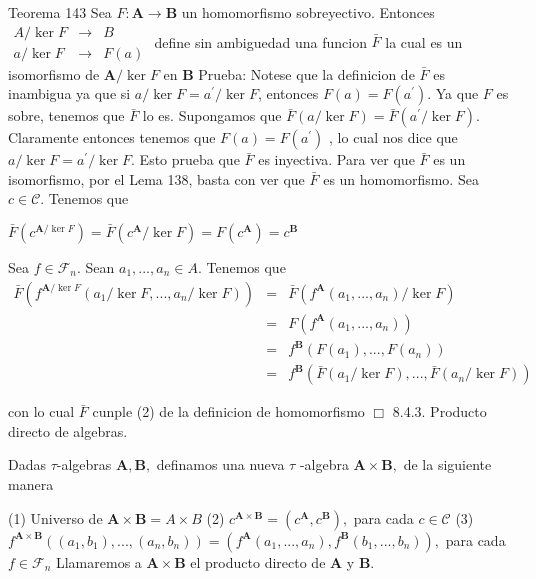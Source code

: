 Teorema 143 Sea \(F:\mathbf{A}\rightarrow \mathbf{B}\) un homomorfismo sobreyectivo. Entonces
\(\displaystyle \begin{array}{lll} A/\ker F & \rightarrow & B \\ a/\ker F & \rightarrow & F(a) \end{array} \)
define sin ambiguedad una funcion \(\bar{F}\) la cual es un isomorfismo de \( \mathbf{A}/\ker F\) en \(\mathbf{B}\)
Prueba: Notese que la definicion de \(\bar{F}\) es inambigua ya que si \(a/\ker F=a^{\prime }/\ker F\), entonces \(F(a)=F(a^{\prime }).\) Ya que \(F\) es sobre, tenemos que \(\bar{F}\) lo es. Supongamos que \(\bar{F}(a/\ker F)=\bar{F} (a^{\prime }/\ker F).\) Claramente entonces tenemos que \(F(a)=F(a^{\prime })\) , lo cual nos dice que \(a/\ker F=a^{\prime }/\ker F\). Esto prueba que \(\bar{F }\) es inyectiva. Para ver que \(\bar{F}\) es un isomorfismo, por el Lema 138, basta con ver que \(\bar{F}\) es un homomorfismo. Sea \(c\in \mathcal{C}\). Tenemos que

\(\displaystyle \bar{F}(c^{\mathbf{A}/\ker F})=\bar{F}(c^{\mathbf{A}}/\ker F)=F(c^{\mathbf{A} })=c^{\mathbf{B}} \)

Sea \(f\in \mathcal{F}_{n}\). Sean \(a_{1},...,a_{n}\in A\). Tenemos que
\(\displaystyle \begin{array}{ccl} \bar{F}(f^{\mathbf{A}/\ker F}(a_{1}/\ker F,...,a_{n}/\ker F)) & = & \bar{F} (f^{\mathbf{A}}(a_{1},...,a_{n})/\ker F) \\ & = & F(f^{\mathbf{A}}(a_{1},...,a_{n})) \\ & = & f^{\mathbf{B}}(F(a_{1}),...,F(a_{n})) \\ & = & f^{\mathbf{B}}(\bar{F}(a_{1}/\ker F),...,\bar{F}(a_{n}/\ker F)) \end{array} \)

con lo cual \(\bar{F}\) cunple (2) de la definicion de homomorfismo \(\Box\)
8.4.3. Producto directo de algebras.

Dadas \(\tau \)-algebras \(\mathbf{A},\mathbf{B},\) definamos una nueva \(\tau \) -algebra \(\mathbf{A}\times \mathbf{B},\) de la siguiente manera

(1) Universo de \(\mathbf{A}\times \mathbf{B}=A\times B\)
(2) \(c^{\mathbf{A}\times \mathbf{B}}=(c^{\mathbf{A}},c^{\mathbf{B}}),\) para cada \(c\in \mathcal{C}\)
(3) \(f^{\mathbf{A}\times \mathbf{B} }((a_{1},b_{1}),...,(a_{n},b_{n}))=(f^{\mathbf{A}}(a_{1},...,a_{n}),f^{ \mathbf{B}}(b_{1},...,b_{n})),\) para cada \(f\in \mathcal{F}_{n}\)
Llamaremos a \(\mathbf{A}\times \mathbf{B}\) el producto directo de \(\mathbf{A}\) y \(\mathbf{B}.\)

